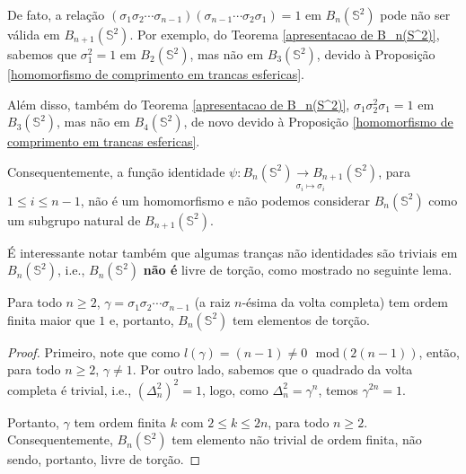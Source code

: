 	\par\vspace{0.3cm} De fato, a relação 
	$(\sigma_1\sigma_2\cdots\sigma_{n-1})(\sigma_{n-1}\cdots\sigma_2\sigma_1) = 1$ 
	em $B_n(\mathbb{S}^2)$ pode não ser válida em $B_{n+1}(\mathbb{S}^2)$. Por exemplo, do 
	Teorema \ref{apresentacao de B_n(S^2)}, sabemos que $\sigma_1^2 = 1$ em 
	$B_2(\mathbb{S}^2)$, mas não em $B_3(\mathbb{S}^2)$, devido à 
	Proposição \ref{homomorfismo de comprimento em trancas esfericas}.
	
	\par\vspace{0.3cm} Além disso, também do Teorema \ref{apresentacao de B_n(S^2)},
	$\sigma_1\sigma_2^2\sigma_1 = 1$ em $B_3(\mathbb{S}^2)$, mas não em $B_4(\mathbb{S}^2)$, 
	de novo devido à Proposição \ref{homomorfismo de comprimento em trancas esfericas}.
	
	\par\vspace{0.3cm} Consequentemente, a função identidade 
	$\displaystyle{\psi: \underset{\sigma_i\mapsto\sigma_i}{B_n(\mathbb{S}^2)
	\to B_{n+1}(\mathbb{S}^2)}}$, para $1\leq i\leq n-1$, não é um homomorfismo e 
	não podemos considerar $B_n(\mathbb{S}^2)$ como um subgrupo natural de $B_{n+1}(\mathbb{S}^2)$.
	
	\par\vspace{0.3cm} É interessante notar também que algumas tranças não identidades são 
	triviais em $B_n(\mathbb{S}^2)$, i.e., $B_n(\mathbb{S}^2)$ \textbf{não é} livre de torção, 
	como mostrado no seguinte lema.
	\begin{lemma}
	\label{B_(S^2) nao livre de torcao}
		Para todo $n\geq2$, $\gamma = \sigma_1\sigma_2\cdots\sigma_{n-1}$ 
		(a raiz $n$-ésima da volta completa) tem ordem finita maior que $1$ e, portanto, 
		$B_n(\mathbb{S}^2)$ tem elementos de torção.
	\end{lemma}
	\begin{proof}
		Primeiro, note que como $l(\gamma) = (n-1)\neq0\text{ }\mathrm{mod}(2(n-1))$,
		então, para todo $n\geq2$, $\gamma\neq1$. Por outro lado, sabemos que o quadrado 
		da volta completa é trivial, i.e., $(\Delta_n^2)^2 = 1$, logo, como $\Delta_n^2 = \gamma^n$, 
		temos $\gamma^{2n} = 1$.
		
		\par\vspace{0.3cm} Portanto, $\gamma$ tem ordem finita $k$ com $2\leq k\leq 2n$, para 
		todo $n\geq 2$. Consequentemente, $B_n(\mathbb{S}^2)$ tem elemento não trivial de ordem 
		finita, não sendo, portanto, livre de torção.
	\end{proof}

